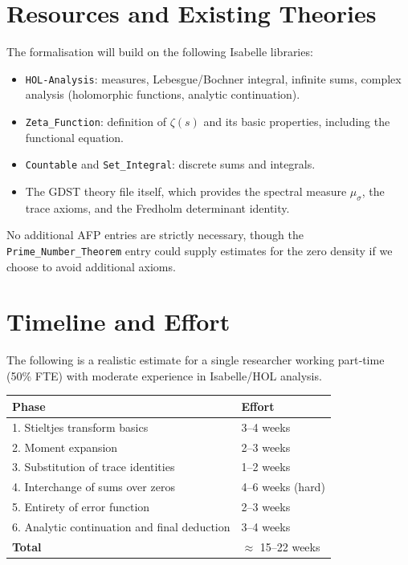 \documentclass[12pt,a4paper]{article}
\begin{document}
\section{Resources and Existing Theories}
The formalisation will build on the following Isabelle libraries:
\begin{itemize}
    \item \texttt{HOL-Analysis}: measures, Lebesgue/Bochner integral, infinite sums, 
          complex analysis (holomorphic functions, analytic continuation).
    \item \texttt{Zeta\_Function}: definition of $\zeta(s)$ and its basic properties, 
          including the functional equation.
    \item \texttt{Countable} and \texttt{Set\_Integral}: discrete sums and integrals.
    \item The GDST theory file itself, which provides the spectral measure $\mu_\sigma$,
          the trace axioms, and the Fredholm determinant identity.
\end{itemize}
No additional AFP entries are strictly necessary, though the \texttt{Prime\_Number\_Theorem} 
entry could supply estimates for the zero density if we choose to avoid additional axioms.

\section{Timeline and Effort}
The following is a realistic estimate for a single researcher working part‑time (50\% FTE) 
with moderate experience in Isabelle/HOL analysis.

\begin{center}
\begin{tabular}{@{}ll@{}}
\toprule
\textbf{Phase} & \textbf{Effort} \\
\midrule
1. Stieltjes transform basics & 3–4 weeks \\
2. Moment expansion & 2–3 weeks \\
3. Substitution of trace identities & 1–2 weeks \\
4. Interchange of sums over zeros & 4–6 weeks (hard) \\
5. Entirety of error function & 2–3 weeks \\
6. Analytic continuation and final deduction & 3–4 weeks \\
\midrule
\textbf{Total} & $\approx$ 15–22 weeks \\
\bottomrule
\end{tabular}
\end{center}
\end{document}

